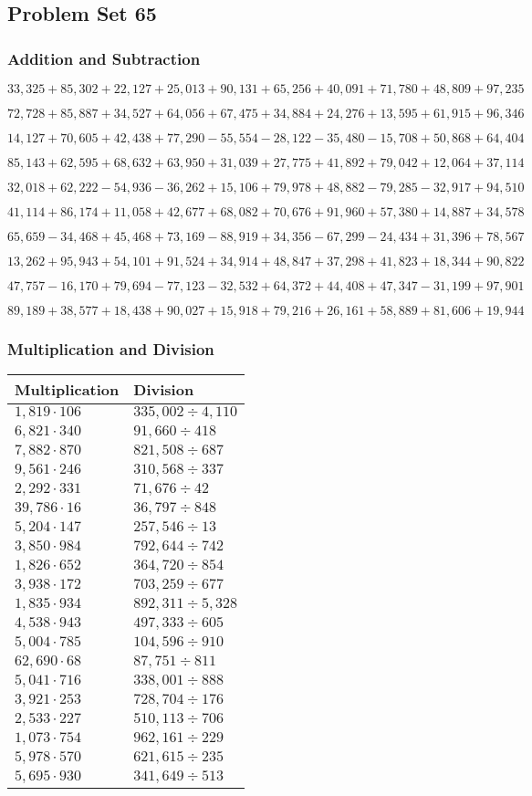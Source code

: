 \hypertarget{problem-set-65}{%
\subsection{Problem Set 65}\label{problem-set-65}}

\hypertarget{addition-and-subtraction-287}{%
\subsubsection{Addition and
Subtraction}\label{addition-and-subtraction-287}}

\(33,325+85,302+22,127+25,013+90,131+65,256+40,091+71,780+48,809+ 97,235\)

\(72,728+85,887+34,527+64,056+67,475+34,884+24,276+13,595+61,915+96,346\)

\(14,127+70,605+42,438+77,290-55,554-28,122-35,480-15,708+50,868+64,404\)

\(85,143+62,595+68,632+63,950+31,039+27,775+41,892+79,042+12,064+37,114\)

\(32,018+62,222-54,936-36,262+15,106+79,978+48,882-79,285-32,917+94,510\)

\(41,114+86,174+11,058+42,677+68,082+70,676+91,960+57,380+14,887+34,578\)

\(65,659-34,468+45,468+73,169-88,919+34,356-67,299-24,434+31,396+78,567\)

\(13,262+95,943+54,101+91,524+34,914+48,847+37,298+41,823+18,344+90,822\)

\(47,757-16,170+79,694-77,123-32,532+64,372+44,408+47,347-31,199+97,901\)

\(89,189+38,577+18,438+90,027+15,918+79,216+26,161+58,889+81,606+19,944\)

\hypertarget{multiplication-and-division-286}{%
\subsubsection{Multiplication and
Division}\label{multiplication-and-division-286}}

\begin{longtable}[]{@{}ll@{}}
\toprule
Multiplication & Division\tabularnewline
\midrule
\endhead
\(1,819\cdot106\) & \(335,002÷4,110\)\tabularnewline
\(6,821\cdot340\) & \(91,660÷418\)\tabularnewline
\(7,882\cdot870\) & \(821,508÷687\)\tabularnewline
\(9,561\cdot246\) & \(310,568÷337\)\tabularnewline
\(2,292\cdot331\) & \(71,676÷42\)\tabularnewline
\(39,786\cdot16\) & \(36,797÷848\)\tabularnewline
\(5,204\cdot147\) & \(257,546÷13\)\tabularnewline
\(3,850\cdot984\) & \(792,644÷742\)\tabularnewline
\(1,826\cdot652\) & \(364,720÷854\)\tabularnewline
\(3,938\cdot172\) & \(703,259÷677\)\tabularnewline
\(1,835\cdot934\) & \(892,311÷5,328\)\tabularnewline
\(4,538\cdot943\) & \(497,333÷605\)\tabularnewline
\(5,004\cdot785\) & \(104,596÷910\)\tabularnewline
\(62,690\cdot68\) & \(87,751÷811\)\tabularnewline
\(5,041\cdot716\) & \(338,001÷888\)\tabularnewline
\(3,921\cdot253\) & \(728,704÷176\)\tabularnewline
\(2,533\cdot227\) & \(510,113÷706\)\tabularnewline
\(1,073\cdot754\) & \(962,161÷229\)\tabularnewline
\(5,978\cdot570\) & \(621,615÷235\)\tabularnewline
\(5,695\cdot930\) & \(341,649÷513\)\tabularnewline
\bottomrule
\end{longtable}

